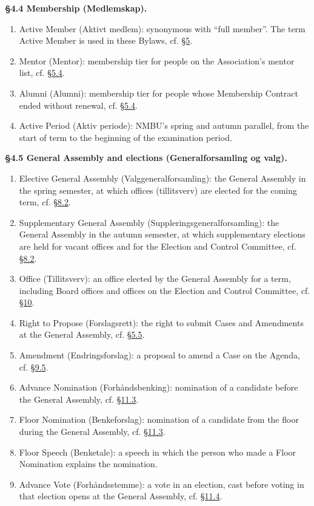 \documentclass{../../../Common/Latex/Templates/rapport}
\begin{document}
\textbf{\S 4.4 Membership (Medlemskap).}\label{bylaw:4.4}
\begin{enumerate}
  \item Active Member (Aktivt medlem): synonymous with ``full member''. The term Active Member is used in these Bylaws, cf. \hyperref[bylaw:5]{\S 5}.
  \item Mentor (Mentor): membership tier for people on the Association's mentor list, cf. \hyperref[bylaw:5.4]{\S 5.4}.
  \item Alumni (Alumni): membership tier for people whose Membership Contract ended without renewal, cf. \hyperref[bylaw:5.4]{\S 5.4}.
  \item Active Period (Aktiv periode): NMBU's spring and autumn parallel, from the start of term to the beginning of the examination period.
\end{enumerate}

\textbf{\S 4.5 General Assembly and elections (Generalforsamling og valg).}\label{bylaw:4.5}
\begin{enumerate}
  \item Elective General Assembly (Valggeneralforsamling): the General Assembly in the spring semester, at which offices (tillitsverv) are elected for the coming term, cf. \hyperref[bylaw:8.2]{\S 8.2}.
  \item Supplementary General Assembly (Suppleringsgeneralforsamling): the General Assembly in the autumn semester, at which supplementary elections are held for vacant offices and for the Election and Control Committee, cf. \hyperref[bylaw:8.2]{\S 8.2}.
  \item Office (Tillitsverv): an office elected by the General Assembly for a term, including Board offices and offices on the Election and Control Committee, cf. \hyperref[bylaw:10]{\S 10}.
  \item Right to Propose (Forslagsrett): the right to submit Cases and Amendments at the General Assembly, cf. \hyperref[bylaw:5.5]{\S 5.5}.
  \item Amendment (Endringsforslag): a proposal to amend a Case on the Agenda, cf. \hyperref[bylaw:9.5]{\S 9.5}.
  \item Advance Nomination (Forhåndsbenking): nomination of a candidate before the General Assembly, cf. \hyperref[bylaw:11.3]{\S 11.3}.
  \item Floor Nomination (Benkeforslag): nomination of a candidate from the floor during the General Assembly, cf. \hyperref[bylaw:11.3]{\S 11.3}.
  \item Floor Speech (Benketale): a speech in which the person who made a Floor Nomination explains the nomination.
  \item Advance Vote (Forhåndsstemme): a vote in an election, cast before voting in that election opens at the General Assembly, cf. \hyperref[bylaw:11.4]{\S 11.4}.
\end{enumerate}
\end{document}
